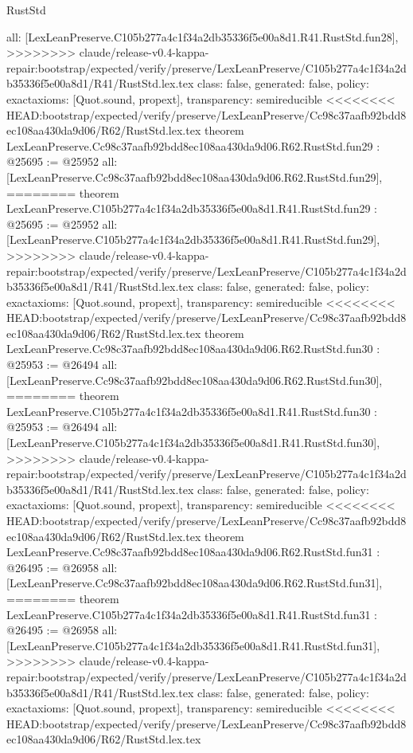 \begin{lexlean}{RustStd}
\begin{coremodule}
{\begin{coremodule}
{{{{{{{{{{{{{{{{{{{{{{{{{{{{{{{{  all: [LexLeanPreserve.C105b277a4c1f34a2db35336f5e00a8d1.R41.RustStd.fun28],
>>>>>>>> claude/release-v0.4-kappa-repair:bootstrap/expected/verify/preserve/LexLeanPreserve/C105b277a4c1f34a2db35336f5e00a8d1/R41/RustStd.lex.tex
  class: false,
  generated: false,
  policy: exact{axioms: [Quot.sound, propext]},
  transparency: semireducible
}
<<<<<<<< HEAD:bootstrap/expected/verify/preserve/LexLeanPreserve/Cc98c37aafb92bdd8ec108aa430da9d06/R62/RustStd.lex.tex
theorem LexLeanPreserve.Cc98c37aafb92bdd8ec108aa430da9d06.R62.RustStd.fun29 : @25695 := @25952 {
  all: [LexLeanPreserve.Cc98c37aafb92bdd8ec108aa430da9d06.R62.RustStd.fun29],
========
theorem LexLeanPreserve.C105b277a4c1f34a2db35336f5e00a8d1.R41.RustStd.fun29 : @25695 := @25952 {
  all: [LexLeanPreserve.C105b277a4c1f34a2db35336f5e00a8d1.R41.RustStd.fun29],
>>>>>>>> claude/release-v0.4-kappa-repair:bootstrap/expected/verify/preserve/LexLeanPreserve/C105b277a4c1f34a2db35336f5e00a8d1/R41/RustStd.lex.tex
  class: false,
  generated: false,
  policy: exact{axioms: [Quot.sound, propext]},
  transparency: semireducible
}
<<<<<<<< HEAD:bootstrap/expected/verify/preserve/LexLeanPreserve/Cc98c37aafb92bdd8ec108aa430da9d06/R62/RustStd.lex.tex
theorem LexLeanPreserve.Cc98c37aafb92bdd8ec108aa430da9d06.R62.RustStd.fun30 : @25953 := @26494 {
  all: [LexLeanPreserve.Cc98c37aafb92bdd8ec108aa430da9d06.R62.RustStd.fun30],
========
theorem LexLeanPreserve.C105b277a4c1f34a2db35336f5e00a8d1.R41.RustStd.fun30 : @25953 := @26494 {
  all: [LexLeanPreserve.C105b277a4c1f34a2db35336f5e00a8d1.R41.RustStd.fun30],
>>>>>>>> claude/release-v0.4-kappa-repair:bootstrap/expected/verify/preserve/LexLeanPreserve/C105b277a4c1f34a2db35336f5e00a8d1/R41/RustStd.lex.tex
  class: false,
  generated: false,
  policy: exact{axioms: [Quot.sound, propext]},
  transparency: semireducible
}
<<<<<<<< HEAD:bootstrap/expected/verify/preserve/LexLeanPreserve/Cc98c37aafb92bdd8ec108aa430da9d06/R62/RustStd.lex.tex
theorem LexLeanPreserve.Cc98c37aafb92bdd8ec108aa430da9d06.R62.RustStd.fun31 : @26495 := @26958 {
  all: [LexLeanPreserve.Cc98c37aafb92bdd8ec108aa430da9d06.R62.RustStd.fun31],
========
theorem LexLeanPreserve.C105b277a4c1f34a2db35336f5e00a8d1.R41.RustStd.fun31 : @26495 := @26958 {
  all: [LexLeanPreserve.C105b277a4c1f34a2db35336f5e00a8d1.R41.RustStd.fun31],
>>>>>>>> claude/release-v0.4-kappa-repair:bootstrap/expected/verify/preserve/LexLeanPreserve/C105b277a4c1f34a2db35336f5e00a8d1/R41/RustStd.lex.tex
  class: false,
  generated: false,
  policy: exact{axioms: [Quot.sound, propext]},
  transparency: semireducible
}
<<<<<<<< HEAD:bootstrap/expected/verify/preserve/LexLeanPreserve/Cc98c37aafb92bdd8ec108aa430da9d06/R62/RustStd.lex.tex
}}}}}}}}}}}}}}}}}}}}}}}}}}}}}}}}}}
\end{coremodule}}
\end{coremodule}
\end{lexlean}
